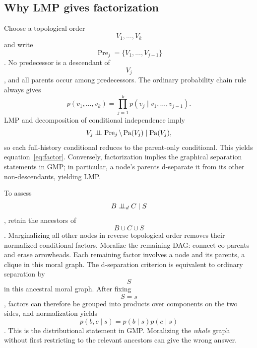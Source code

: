 \subsection{Why LMP gives factorization}
Choose a topological order $$V_1,\ldots,V_k$$ and write $$\operatorname{Pre}_j=\{V_1,\ldots,V_{j-1}\}$$. No predecessor is a descendant of $$V_j$$, and all parents occur among predecessors. The ordinary probability chain rule always gives
\begin{equation}
p(v_1,\ldots,v_k)=\prod_{j=1}^k p(v_j\mid v_1,\ldots,v_{j-1}).
\end{equation}
LMP and decomposition of conditional independence imply
\begin{equation}
V_j\mathrel{\perp\!\!\!\perp}\operatorname{Pre}_j\setminus\operatorname{Pa}(V_j)\mid\operatorname{Pa}(V_j),
\end{equation}
so each full-history conditional reduces to the parent-only conditional. This yields equation~\eqref{eq:factor}. Conversely, factorization implies the graphical separation statements in GMP; in particular, a node's parents d-separate it from its other non-descendants, yielding LMP.
\begin{supplement}
To assess $$B\mathrel{\perp\!\!\!\perp}_{d} C\mid S$$, retain the ancestors of $$B\cup C\cup S$$. Marginalizing all other nodes in reverse topological order removes their normalized conditional factors. Moralize the remaining DAG: connect co-parents and erase arrowheads. Each remaining factor involves a node and its parents, a clique in this moral graph. The d-separation criterion is equivalent to ordinary separation by $$S$$ in this ancestral moral graph. After fixing $$S=s$$, factors can therefore be grouped into products over components on the two sides, and normalization yields $$p(b,c\mid s)=p(b\mid s)p(c\mid s)$$. This is the distributional statement in GMP. Moralizing the \emph{whole} graph without first restricting to the relevant ancestors can give the wrong answer.
\end{supplement}


